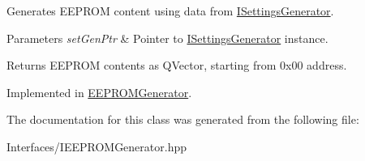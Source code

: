 Generates E\+E\+P\+R\+OM content using data from \hyperlink{class_interfaces_1_1_i_settings_generator}{I\+Settings\+Generator}. 


\begin{DoxyParams}{Parameters}
{\em set\+Gen\+Ptr} & Pointer to \hyperlink{class_interfaces_1_1_i_settings_generator}{I\+Settings\+Generator} instance. \\
\hline
\end{DoxyParams}
\begin{DoxyReturn}{Returns}
E\+E\+P\+R\+OM contents as Q\+Vector, starting from 0x00 address. 
\end{DoxyReturn}


Implemented in \hyperlink{class_e_e_p_r_o_m_generator_a29a14421340137b191f3425d6bcc5cae}{E\+E\+P\+R\+O\+M\+Generator}.



The documentation for this class was generated from the following file\+:\begin{DoxyCompactItemize}
\item 
Interfaces/I\+E\+E\+P\+R\+O\+M\+Generator.\+hpp\end{DoxyCompactItemize}
